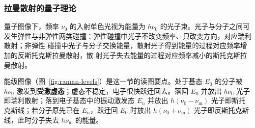 \subsubsection{拉曼散射的量子理论}

量子图像下，频率 $\nu_0$ 的入射单色光视为能量为 $h\nu_0$ 的光子束。光子与分子之间可
发生弹性与非弹性两类碰撞：弹性碰撞中光子不改变频率、只改变方向，对应瑞利散射；非弹性
碰撞中光子与分子交换能量，散射光子得到能量的过程对应频率增加的反斯托克斯拉曼散射，散
射光子失去能量的过程对应频率减小的斯托克斯拉曼散射。

能级图像（图~\ref{fig:raman-levels}）是这一节的读图要点。处于基态 $E_0$ 的分子被
$h\nu_0$ 激发到\textbf{受激虚态}；虚态不稳定，电子很快跃迁回去。落回 $E_0$ 并放出
$h\nu_0$ 光子即瑞利散射；落到电子基态中的振动激发态 $E_n$ 并放出
$h(\nu_0-\nu_{\mathrm{m}})$ 光子即斯托克斯线；若分子原先已在 $E_n$，跃迁回 $E_0$ 时放出
$h(\nu_0+\nu_{\mathrm{m}})$ 光子即反斯托克斯线，此时分子失去 $h\nu_{\mathrm{m}}$ 的能量。

